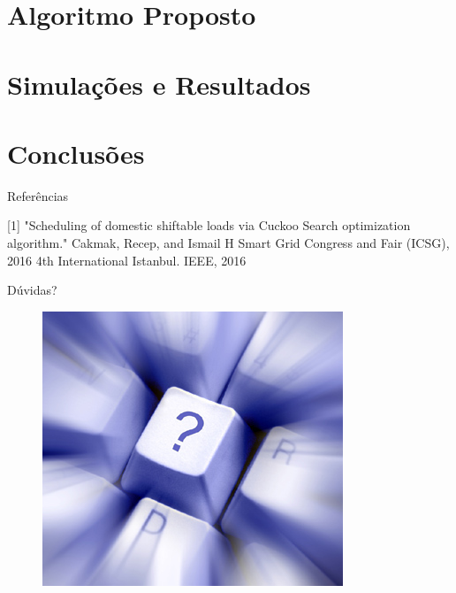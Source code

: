 \documentclass{beamer}
\begin{document}
\section[Algoritmo]{Algoritmo Proposto}
\frame{\tableofcontents[currentsection]}


\section[Resultados]{Simulações e Resultados}
\frame{\tableofcontents[currentsection]}


\section{Conclusões}
\frame{\tableofcontents[currentsection]}



\begin{frame}[allowframebreaks]{Referências}
% 

\begin{thebibliography}{10}
		[1]
			"Scheduling of domestic shiftable loads via Cuckoo Search optimization
      algorithm."
      \newblock Cakmak, Recep, and Ismail H
      \newblock Smart Grid Congress and Fair (ICSG), 2016 4th International
      Istanbul. IEEE, 2016
\end{thebibliography}
\end{frame}

\begin{frame}{Dúvidas?}
  \begin{figure}[h]
  	\begin{center}
      \includegraphics [scale=0.4]{./Figures/duvida}
  	\end{center}
  \end{figure}
\end{frame}
\end{document}
